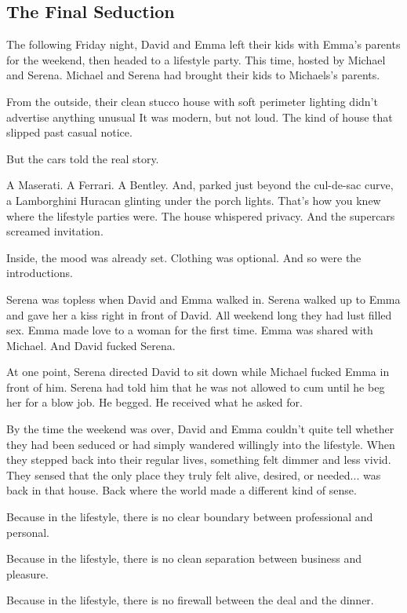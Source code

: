 
\subsection{The Final Seduction}

The following Friday night, David and Emma left their kids with Emma's parents for the weekend,
then headed to a lifestyle party. This time, hosted by Michael and Serena. Michael and Serena had 
brought their kids to Michaels’s parents. 

From the outside, their clean stucco house with soft perimeter lighting didn’t advertise anything unusual
It was modern, but not loud. The kind of house that slipped past casual notice.

But the cars told the real story.

A Maserati. A Ferrari. A Bentley. And, parked just beyond the cul-de-sac curve, a Lamborghini Huracan glinting 
under the porch lights.
That’s how you knew where the lifestyle parties were. The house whispered privacy. And the supercars screamed 
invitation.

Inside, the mood was already set. Clothing was optional.  And so were the introductions.

Serena was topless when David and Emma walked in. Serena walked up to Emma and gave her a kiss right in front of 
David. All weekend long they had lust 
filled sex. Emma made love to a woman for the first time. Emma was shared with Michael. 
And David fucked Serena. 

At one point, Serena directed David to sit down while Michael fucked Emma in front of him. Serena had told him
that he was not 
allowed to cum until 
he beg her for a blow job. He begged. He received what he asked for.

By the time the weekend was over, David and 
Emma couldn’t quite tell whether they had been seduced or had simply wandered willingly into the lifestyle.
When they stepped back 
into their regular lives, something felt dimmer and less vivid. 
They sensed that the only place they truly felt alive, 
desired, or needed... was back in that house. 
Back where the world made a different kind of sense.

Because in the lifestyle, there is no clear boundary between professional and personal.  

Because in the lifestyle, there is no clean separation between business and pleasure.  

Because in the lifestyle, there is no firewall between the deal and the dinner.


